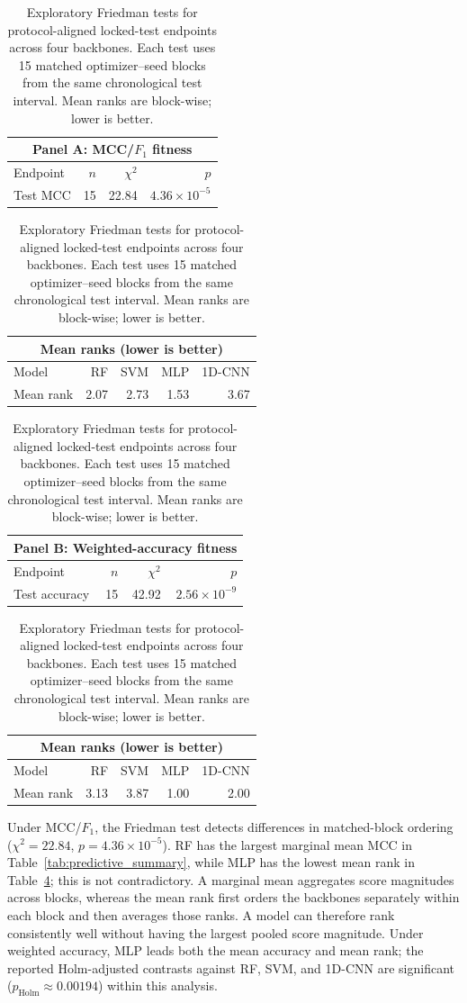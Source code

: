 \begin{table}[!htbp]
\centering
\caption{Exploratory Friedman tests for protocol-aligned locked-test endpoints across four backbones. Each test uses 15 matched optimizer--seed blocks from the same chronological test interval. Mean ranks are block-wise; lower is better.}
\label{tab:predictive_inference}
\small
\setlength{\tabcolsep}{6pt}
\begin{tabular}{lrrr}\toprule
\multicolumn{4}{c}{\textbf{Panel A: MCC/$F_1$ fitness}}\\\midrule
Endpoint & $n$ & $\chi^2$ & $p$\\\midrule
Test MCC & 15 & 22.84 & $4.36\times10^{-5}$\\\bottomrule
\end{tabular}

\vspace{0.45em}
\begin{tabular}{lrrrr}\toprule
\multicolumn{5}{c}{\textbf{Mean ranks (lower is better)}}\\\midrule
Model & RF & SVM & MLP & 1D-CNN\\\midrule
Mean rank & 2.07 & 2.73 & 1.53 & 3.67\\\bottomrule
\end{tabular}

\vspace{0.8em}
\begin{tabular}{lrrr}\toprule
\multicolumn{4}{c}{\textbf{Panel B: Weighted-accuracy fitness}}\\\midrule
Endpoint & $n$ & $\chi^2$ & $p$\\\midrule
Test accuracy & 15 & 42.92 & $2.56\times10^{-9}$\\\bottomrule
\end{tabular}

\vspace{0.45em}
\begin{tabular}{lrrrr}\toprule
\multicolumn{5}{c}{\textbf{Mean ranks (lower is better)}}\\\midrule
Model & RF & SVM & MLP & 1D-CNN\\\midrule
Mean rank & 3.13 & 3.87 & 1.00 & 2.00\\\bottomrule
\end{tabular}
\end{table}

Under MCC/$F_1$, the Friedman test detects differences in matched-block ordering ($\chi^2=22.84$, $p=4.36\times10^{-5}$). RF has the largest marginal mean MCC in Table~\ref{tab:predictive_summary}, while MLP has the lowest mean rank in Table~\ref{tab:predictive_inference}; this is not contradictory. A marginal mean aggregates score magnitudes across blocks, whereas the mean rank first orders the backbones separately within each block and then averages those ranks. A model can therefore rank consistently well without having the largest pooled score magnitude. Under weighted accuracy, MLP leads both the mean accuracy and mean rank; the reported Holm-adjusted contrasts against RF, SVM, and 1D-CNN are significant ($p_{\mathrm{Holm}}\approx0.00194$) within this analysis.

